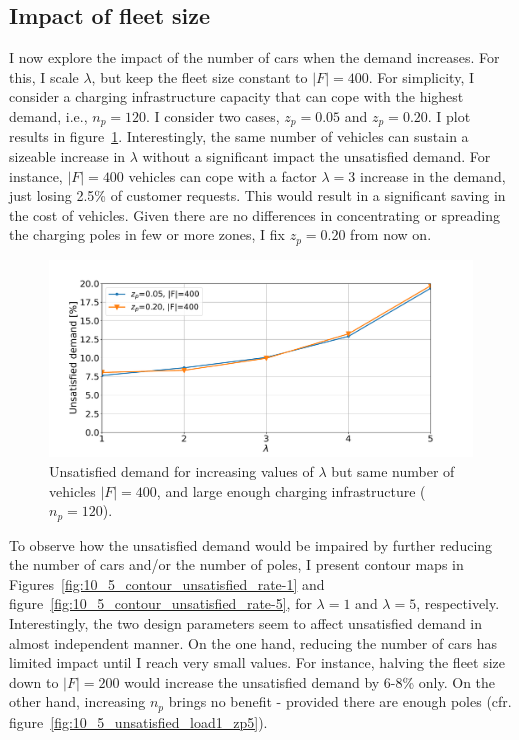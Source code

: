 \subsection{Impact of fleet size}
I now explore the impact of the number of cars when the demand increases. For this, I scale $\lambda$, but keep the fleet size constant to $|F|=400$. For simplicity, I consider a  charging infrastructure capacity that can cope with the highest demand, i.e., $n_p=120$. I consider two cases, $z_p=0.05$ and $z_p=0.20$. I plot results in figure~\ref{fig:10_5_unsatisfied_zp_fixed_request}.
Interestingly, the same number of vehicles can sustain a sizeable increase in $\lambda$ without a significant impact the unsatisfied demand. 
For instance, $|F|=400$ vehicles can cope with a factor $\lambda=3$ increase in the demand, just losing 2.5\% of customer requests. This would result in a significant saving in the cost of vehicles. Given there are no differences in concentrating or spreading the charging poles in few or more zones, I fix $z_p=0.20$ from now on.

\begin{figure}
\centering
\includegraphics[width=1.\linewidth]{fig/final/const_fleet_zp.pdf}
\caption{Unsatisfied demand for increasing values of $\lambda$ but same number of vehicles $|F|=400$, and large enough charging infrastructure ($n_p=120$).}
\label{fig:10_5_unsatisfied_zp_fixed_request}
\end{figure}

To observe how the unsatisfied demand would be impaired by further reducing the number of cars and/or the number of poles, I present contour maps in Figures~\ref{fig:10_5_contour_unsatisfied_rate-1} and figure~\ref{fig:10_5_contour_unsatisfied_rate-5}, for $\lambda=1$ and $\lambda=5$, respectively. 
Interestingly, the two design parameters seem to affect unsatisfied demand in almost independent manner. On the one hand, reducing the number of cars has limited impact until I reach very small values. For instance, halving the fleet size down to $|F|=200$ would increase the unsatisfied demand by 6-8\% only.
On the other hand, increasing $n_p$ brings no benefit - provided there are enough poles (cfr. figure~\ref{fig:10_5_unsatisfied_load1_zp5}).


